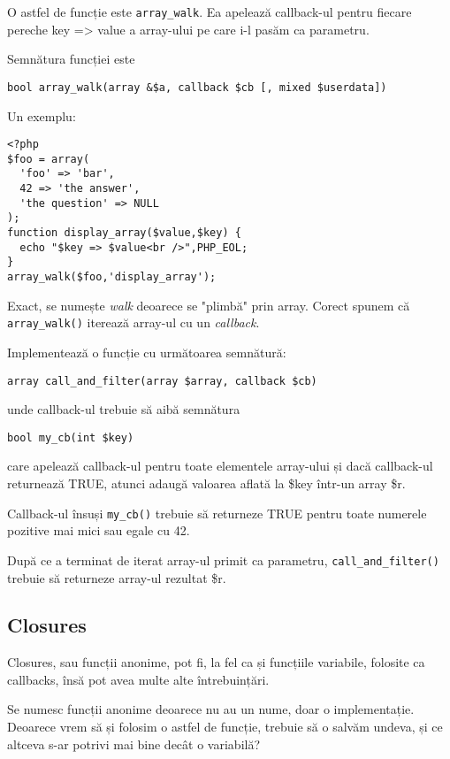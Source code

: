 O astfel de funcție este \texttt{array\_walk}. Ea apelează callback-ul
pentru fiecare pereche key => value a array-ului pe care i-l pasăm ca parametru.

Semnătura funcției este
\begin{verbatim}
bool array_walk(array &$a, callback $cb [, mixed $userdata])
\end{verbatim}
Un exemplu:
\begin{lstlisting}
<?php
$foo = array(
  'foo' => 'bar',
  42 => 'the answer',
  'the question' => NULL
);
function display_array($value,$key) {
  echo "$key => $value<br />",PHP_EOL;
}
array_walk($foo,'display_array');
\end{lstlisting}
Exact, se numește \textit{walk} deoarece se "plimbă" prin array.
Corect spunem că \texttt{array\_walk()} iterează array-ul
cu un \textit{callback}.

\begin{Exercise}[title={Callbacks}]
Implementează o funcție cu următoarea semnătură:
\begin{verbatim}
array call_and_filter(array $array, callback $cb)
\end{verbatim}
unde callback-ul trebuie să aibă semnătura
\begin{verbatim}
bool my_cb(int $key)
\end{verbatim}
care apelează callback-ul pentru toate elementele array-ului și dacă
callback-ul returnează TRUE, atunci adaugă valoarea aflată la \$key
într-un array \$r.

Callback-ul însuși \texttt{my\_cb()} trebuie să returneze TRUE pentru
toate numerele pozitive mai mici sau egale cu 42.

După ce a terminat de iterat array-ul primit ca
parametru, \texttt{call\_and\_filter()} trebuie să returneze array-ul
rezultat \$r.
\end{Exercise}


\subsection{Closures}
Closures, sau funcții anonime, pot fi, la fel ca și funcțiile variabile,
folosite ca callbacks, însă pot avea multe alte întrebuințări.

Se numesc funcții anonime deoarece nu au un nume, doar o implementație.
Deoarece vrem să și folosim o astfel de funcție, trebuie să o salvăm
undeva, și ce altceva s-ar potrivi mai bine decât o variabilă?

